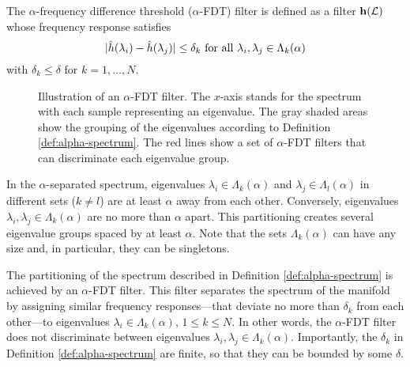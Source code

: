 \begin{definition}\label{def:alpha-filter}
The $\alpha$-frequency difference threshold ($\alpha$-FDT) filter is defined as a filter ${\mathbf h}({\mathcal L})$ whose frequency response satisfies
\begin{equation} \label{eq:fdt-filter}
    |{\hat h}(\lambda_i)-{\hat h}(\lambda_j)|\leq \delta_k \mbox{ for all } \lambda_i, \lambda_j \in \Lambda_k(\alpha) 
\end{equation}
with $\delta_k\leq \delta$ for $k=1, \ldots,N$.
\end{definition}


\begin{figure}
\centering
      
  \caption{Illustration of an $\alpha$-FDT filter. The $x$-axis stands for the spectrum with each sample representing an eigenvalue. The gray shaded areas show the grouping of the eigenvalues according to Definition \ref{def:alpha-spectrum}. The red lines show a set of $\alpha$-FDT filters that can discriminate each eigenvalue group.}
\label{fig:alpha}
\end{figure}

In the $\alpha$-separated spectrum, eigenvalues $\lambda_i \in \Lambda_k(\alpha)$ and $\lambda_j \in \Lambda_l(\alpha)$ in different sets ($k \neq l$) are at least $\alpha$ away from each other. Conversely, eigenvalues $\lambda_i, \lambda_j \in \Lambda_k(\alpha)$ are no more than $\alpha$ apart. This partitioning creates several eigenvalue groups spaced by at least $\alpha$. Note that the sets $\Lambda_k(\alpha)$ can have any size and, in particular, they can be singletons.

The partitioning of the spectrum described in Definition \ref{def:alpha-spectrum} is achieved by an $\alpha$-FDT filter. This filter separates the spectrum of the manifold by {assigning similar frequency responses---that deviate no more than $\delta_k$ from each other---to eigenvalues $\lambda_i \in \Lambda_k(\alpha)$, $1 \leq k \leq N$. In other words, the $\alpha$-FDT filter does not discriminate between eigenvalues $\lambda_i, \lambda_j \in\Lambda_k(\alpha)$. Importantly, the $\delta_k$ in Definition \ref{def:alpha-spectrum} are finite, so that they can be bounded by some $\delta$.} 

